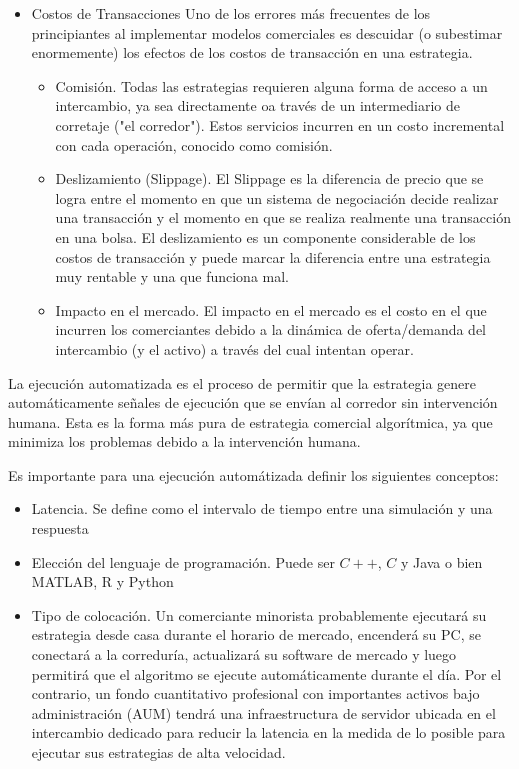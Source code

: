 \documentclass{article}
\begin{document}
\begin{itemize}
 \item Costos de Transacciones
Uno de los errores más frecuentes de los principiantes al implementar modelos comerciales es descuidar (o subestimar enormemente) los efectos de los costos de transacción en una estrategia.

\begin{itemize}
    \item Comisión.
    Todas las estrategias requieren alguna forma de acceso a un intercambio, ya sea directamente oa través de un intermediario de corretaje ("el corredor"). Estos servicios incurren en un costo incremental con cada operación, conocido como comisión.
\item Deslizamiento (Slippage).
El Slippage es la diferencia de precio que se logra entre el momento en que un sistema de negociación decide realizar una transacción y el momento en que se realiza realmente una transacción en una bolsa. El deslizamiento es un componente considerable de los costos de transacción y puede marcar la diferencia entre una estrategia muy rentable y una que funciona mal.
\item Impacto en el mercado. El impacto en el mercado es el costo en el que incurren los comerciantes debido a la dinámica de oferta/demanda del intercambio (y el activo) a través del cual intentan operar. \cite{halls-moore}
\end{itemize}
\end{itemize}

La ejecución automatizada es el proceso de permitir que la estrategia genere automáticamente señales de ejecución que se envían al corredor sin intervención humana. Esta es la forma más pura de estrategia comercial algorítmica, ya que minimiza los problemas debido a la intervención humana. 

Es importante para una ejecución automátizada definir los siguientes conceptos:

\begin{itemize}
    \item Latencia.
    Se define como el intervalo de tiempo entre una simulación y una respuesta
     \item Elección del lenguaje de programación. 
     Puede ser  $C++$, $C$ y Java o bien  MATLAB, R y Python
    \item Tipo de colocación. 
    Un comerciante minorista probablemente ejecutará su estrategia desde casa durante el horario de mercado, encenderá su PC, se conectará a la correduría, actualizará su software de mercado y luego permitirá que el algoritmo se ejecute automáticamente durante el día. Por el contrario, un fondo cuantitativo profesional con importantes activos bajo administración (AUM) tendrá una infraestructura de servidor ubicada en el intercambio dedicado para reducir la latencia en la medida de lo posible para ejecutar sus estrategias de alta velocidad.
\end{itemize}
\end{document}
